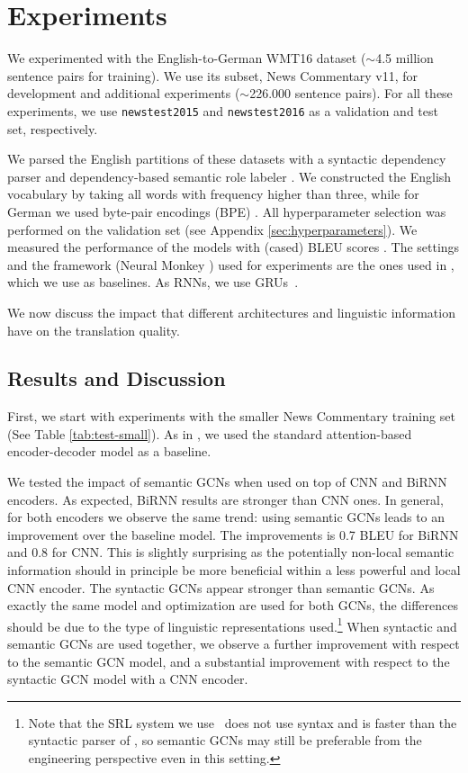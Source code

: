 \documentclass[11pt,a4paper]{article}
\begin{document}
\section{Experiments} 
We experimented with the English-to-German WMT16 dataset ($\sim$4.5 million sentence pairs for training).
We use its subset, News Commentary v11, for development and additional experiments ($\sim$226.000 sentence pairs).
For all these experiments, we use \texttt{newstest2015} and \texttt{newstest2016} as a validation and test set, respectively.

We parsed the English partitions of these datasets with a syntactic dependency parser \cite{P16-1231} and dependency-based semantic role labeler \cite{marcheggiani-frolov-titov:2017:srl}.
We constructed the English vocabulary by taking all words with frequency higher than three, while for German we used byte-pair encodings (BPE) \cite{sennrich2016subword}.
All hyperparameter selection was performed on the validation set (see Appendix \ref{sec:hyperparameters}).
We measured the performance of the models with (cased) BLEU scores \cite{papineni2002bleu}.
The settings and the framework (Neural Monkey \cite{NeuralMonkey:2017}) used for experiments are the ones used in , which we use as baselines. As RNNs, we use GRUs~\cite{cho14emnlp}.

We now discuss the impact that different architectures and linguistic information have on the translation quality. 

\subsection{Results and Discussion}

First, we start with experiments with the smaller News Commentary training set (See Table \ref{tab:test-small}).  
As in , we used the standard attention-based encoder-decoder model as a baseline.

We tested the impact of semantic GCNs when used on top of CNN and BiRNN encoders. As expected, BiRNN results are stronger than CNN ones.
In general, for both encoders we observe the same trend: using semantic GCNs leads to an improvement over the baseline model. 
The improvements is 0.7 BLEU for BiRNN and 0.8 for CNN. 
This is slightly surprising as the potentially non-local semantic information should in principle be more beneficial within a less powerful and local CNN encoder. 
The syntactic GCNs  \cite{bastings-EtAl:2017:EMNLP2017} appear stronger than semantic GCNs. 
As exactly the same model and optimization are used for both GCNs, the differences should be due to the type of linguistic representations used.\footnote{Note that the SRL system we use~\cite{marcheggiani-frolov-titov:2017:srl} does not use syntax and is faster than the syntactic parser of , so semantic GCNs may still be preferable from the engineering perspective even in this setting.}
When syntactic and semantic GCNs are used together, we observe a further improvement with respect to the semantic GCN model, and a substantial improvement with respect to the syntactic GCN model with a CNN encoder.
\end{document}
